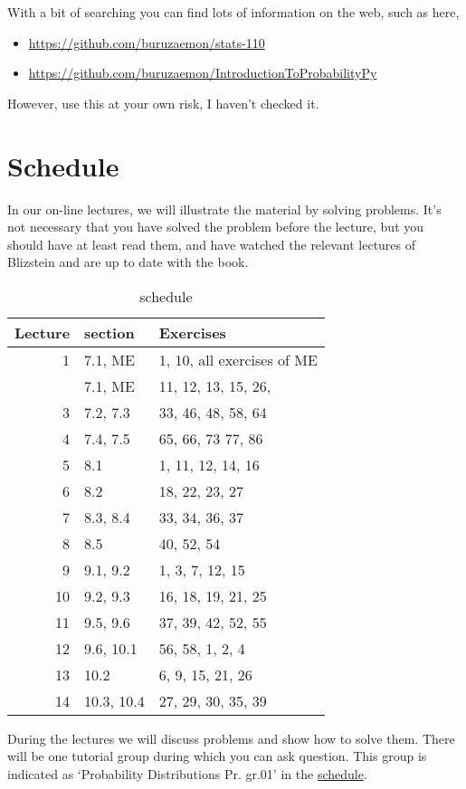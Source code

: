 \documentclass[a4paper]{article}
\theoremstyle{definition}
\newcommand{\1}[1]{\,I_{#1}} %
\begin{document}
With a bit of searching you can find lots of information on the web, such as here, 
\begin{itemize}
\item \url{https://github.com/buruzaemon/stats-110}
\item \url{https://github.com/buruzaemon/IntroductionToProbabilityPy}
\end{itemize}
However, use this at your own risk, I haven't checked it.

\section{Schedule}
\label{sec:org33d1e91}

In our on-line lectures, we will illustrate the material by solving problems.
It's not necessary that you have solved the problem before the lecture, but you should have at least read them, and have watched the relevant lectures of Blizstein and are up to date with the book.

\begin{table}[htbp]
\caption{schedule}
\centering
\begin{tabular}{rll}
Lecture & section & Exercises\\
\hline
1 & 7.1, ME & 1, 10, all exercises of ME\\
 & 7.1, ME & 11, 12, 13, 15, 26,\\
\hline
3 & 7.2, 7.3 & 33, 46, 48, 58, 64\\
4 & 7.4, 7.5 & 65, 66, 73 77, 86\\
\hline
5 & 8.1 & 1, 11, 12, 14, 16\\
6 & 8.2 & 18, 22, 23, 27\\
\hline
7 & 8.3, 8.4 & 33, 34, 36, 37\\
8 & 8.5 & 40, 52, 54\\
\hline
9 & 9.1, 9.2 & 1, 3, 7, 12, 15\\
10 & 9.2, 9.3 & 16, 18, 19, 21, 25\\
\hline
11 & 9.5, 9.6 & 37, 39, 42, 52, 55\\
12 & 9.6, 10.1 & 56, 58, 1, 2, 4\\
\hline
13 & 10.2 & 6, 9, 15, 21, 26\\
14 & 10.3, 10.4 & 27, 29, 30, 35, 39\\
\hline
\end{tabular}
\end{table}

During the lectures we will discuss problems and show how to solve them.
There will be one tutorial group during which you can ask question.
This group is indicated as `Probability Distributions Pr.
gr.01' in the \href{https://rooster.rug.nl/#/en/current/schedule/course-EBP038A05}{schedule}.
\end{document}
